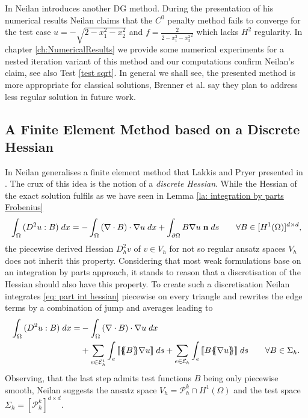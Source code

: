 In \cite{Neilan2014} Neilan introduces another DG method. During the presentation of his numerical results Neilan claims that the $C^0$ penalty method fails to converge for the test case $u = -\sqrt{2 - x_1^2 - x_2^2 }$ and $f = \frac 2 {{2 - x_1^2 - x_2^2}^2}$ which lacks $H^2$ regularity. 
In chapter \ref{ch:NumericalResults} we provide some numerical experiments for a nested iteration variant of this method and our computations confirm Neilan's claim, see also Test \ref{test sqrt}. In general we shall see, the presented method is more appropriate for classical solutions, Brenner et al. say they plan to address less regular solution in future work. 


\subsection{A Finite Element Method based on a Discrete Hessian} \label{subsec: disrete Hessian} \label{sec: FEM discrete Hessian}

In \cite{Neilan2014} Neilan generalises a finite element method that Lakkis and Pryer presented in \cite{LP2011}.
The crux of this idea is the notion of a \emph{discrete Hessian}. 
While the Hessian of the exact solution fulfils as we have seen in Lemma \ref{la: integration by parts Frobenius}
	\begin{align}
		\int_{\Omega} {{ (D^2 u : B)}\;dx} = 
			- \int_{\Omega} {{ \left(\nabla \cdot B\right) \cdot \nabla u}\;dx} 
			+ \int_{\partial \Omega} {{B \nabla u \; \mathbf {n}}\;ds} \qquad \forall B \in [H^1(\Omega)]^{d \times d}, \label{eq: part int hessian}
	\end{align}
the piecewise derived Hessian $D_h^2 v$ of $ v \in V_h$ for not so regular ansatz spaces $V_h$ does not inherit this property. Considering that most weak formulations base on an integration by parts approach, it stands to reason that a discretisation of the Hessian should also have this property. To create such a discretisation Neilan integrates \eqref{eq: part int hessian} piecewise on every triangle and rewrites the edge terms by a combination of jump and averages leading to
	\begin{align}
		\myIntX  \Omega { (D^2 u : B)}
		=& - \myIntX  \Omega { \left(\nabla \cdot B\right) \cdot \nabla u} \nonumber \\
			&+ \sum_{ e \in \edgesi} \myIntS e { \jump {\average B \nabla u }}
			+ \sum_{ e \in \edges} \myIntS e {  \jump{B \average {\nabla u} }}  \qquad \forall B \in \Sigma_h. \label{eq: part int hessian omega}
	\end{align}
Observing, that the last step admits test functions $B$ being only piecewise smooth, Neilan suggests the ansatz space $V_h = \mathcal{P}_h^k \cap H^1(\Omega)$ and the test space $\Sigma_h = [\mathcal{P}_h^k]^{d \times d}$.

